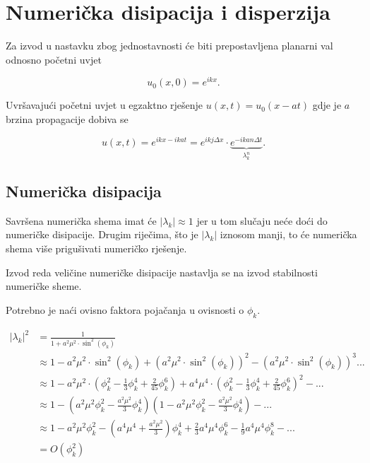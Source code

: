 \documentclass{article}
\begin{document}
\section{Numerička disipacija i disperzija}

Za izvod u nastavku zbog jednostavnosti će biti prepostavljena planarni val
odnosno početni uvjet

\begin{equation}
    u_0(x, 0) = e^{i k x}.
\end{equation}

Uvršavajući početni uvjet u egzaktno rješenje $u(x, t) = u_0(x - at)$ gdje je
$a$ brzina propagacije dobiva se

\begin{equation}
    u(x, t) = e^{i k x - i k a t} =
              e^{i k j \Delta x} \cdot
              \underbrace{e^{-i k a n \Delta t}}_{\lambda_k^n}.
\end{equation}


\subsection{Numerička disipacija}

Savršena numerička shema imat će $|\lambda_k| \approx 1$ jer u tom slučaju neće
doći do numeričke disipacije. Drugim riječima, što je $|\lambda_k|$ iznosom
manji, to će numerička shema više prigušivati numeričko rješenje.

Izvod reda veličine numeričke disipacije nastavlja se na izvod stabilnosti
numeričke sheme.

Potrebno je naći ovisno faktora pojačanja u ovisnosti o $\phi_k$.

\begin{align*}
    |\lambda_k|^2 &= \frac{1}{1 + a^2 \mu^2 \cdot \sin^2(\phi_k)} \\
    &\approx 1 - a^2 \mu ^2 \cdot \sin^2(\phi_k) +
        \left(a^2 \mu ^2 \cdot \sin^2(\phi_k)\right)^2 -
        \left(a^2 \mu ^2 \cdot \sin^2(\phi_k)\right)^3... \\
    &\approx 1 -
        a^2 \mu^2 \cdot
        \left(\phi_k^2 - \frac{1}{3} \phi_k^4 + \frac{2}{45} \phi_k^6\right) +
        a^4 \mu^4 \cdot
        \left(\phi_k^2 - \frac{1}{3} \phi_k^4 + \frac{2}{45} \phi_k^6\right)^2
        - ... \\
    &\approx 1 -
        \left(a^2 \mu^2 \phi_k^2 - \frac{a^2 \mu^2}{3} \phi_k^4\right)
        \left(1 - a^2 \mu^2 \phi_k^2 - \frac{a^2 \mu^2}{3} \phi_k^4\right)
        - ... \\
    &\approx 1 - a^2\mu^2 \phi_k^2 -
        \left(a^4 \mu^4 + \frac{a^2 \mu^2}{3}\right) \phi_k^4
        + \frac{2}{3} a^4 \mu^4 \phi_k^6 - \frac{1}{9}a^4 \mu^4 \phi_k^8
        - ... \\
    &= O\left(\phi_k^2\right)
\end{align*}
\end{document}
